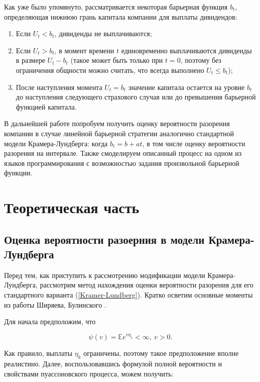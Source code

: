\documentclass{article}
\theoremstyle{plain}
\theoremstyle{plain}
\theoremstyle{plain}
\theoremstyle{plain}
\theoremstyle{definition}
\theoremstyle{remark}
\begin{document}
Как уже было упомянуто, рассматривается некоторая барьерная функция $b_t$, определяющая нижнюю грань капитала компании для выплаты дивидендов:

\begin{enumerate}
    \item Если $U_t < b_t$, дивиденды не выплачиваются;
    \item Если $U_t > b_t$, в момент времени $t$ единовременно выплачиваются дивиденды в размере $U_t - b_t$ (такое может быть только при $t = 0$, поэтому без ограничения общности можно считать, что всегда выполнено $U_t \leq b_t$);
    \item После наступления момента $U_t = b_t$ значение капитала остается на уровне $b_t$ до наступления следующего страхового случая или до превышения барьерной функцией капитала.
\end{enumerate}

В дальнейшей работе попробуем получить оценку вероятности разорения компании в случае линейной барьерной стратегии аналогично стандартной модели Крамера-Лундберга: когда $b_t = b + at$, в том числе оценку вероятности разорения на интервале. Также смоделируем описанный процесс на одном из языков программирования с возможностью задания произвольной барьерной функции.


\section{Теоретическая часть}

\subsection{Оценка вероятности разоерния в модели Крамера-Лундберга}
\label{KL_Shiryaev_section}

Перед тем, как приступить к рассмотрению модификации модели Крамера-Лундберга, рассмотрим метод нахождения оценки вероятности разорения для его стандартного варианта (\ref{Kramer-Lundberg}). Кратко осветим основные моменты из работы Ширяева, Булинского \cite{Shiryaev_stochastic}.

Для начала предположим, что

\begin{equation}
    \psi(v) = \mathbb{E} e^{v \eta_1} < \infty,\ v > 0.
\end{equation}

Как правило, выплаты $\eta_k$ ограничены, поэтому такое предположение вполне реалистино. Далее, воспользовавшись формулой полной вероятности и свойствами пуассоновского процесса, можем получить:
\end{document}
